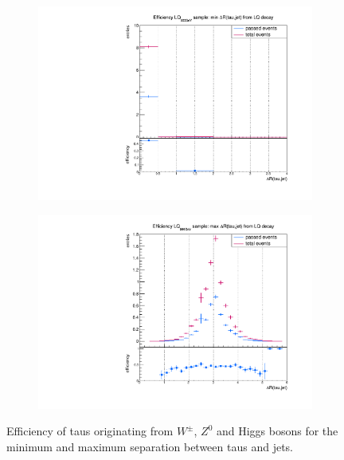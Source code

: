 \begin{figure}
\begin{subfigure}[t]{0.49\textwidth}
                \label{dR:bg:prompt:taujets:max}
                \end{subfigure}
                \begin{subfigure}[t]{0.49\textwidth}
                \includegraphics[width=\textwidth]{figures/plots/ttH/Divided_fromH_mindR_taujet.pdf}
                \label{dR:bg:fromH:taujets:min}
                \end{subfigure}
                \begin{subfigure}[t]{0.49\textwidth}
                \includegraphics[width=\textwidth]{figures/plots/ttH/Divided_maxdR_fromH_taujet.pdf}
                \label{dR:bg:fromH:taujets:max}
                \end{subfigure}
\caption[Efficiency of taus originating from $W^\pm$, $Z^0$ and Higgs bosons for the separation between taus and jets.]{Efficiency of taus originating from $W^\pm$, $Z^0$ and Higgs bosons for the minimum and maximum separation between taus and jets.}
\label{dR:bg:taujets}
\end{figure}
